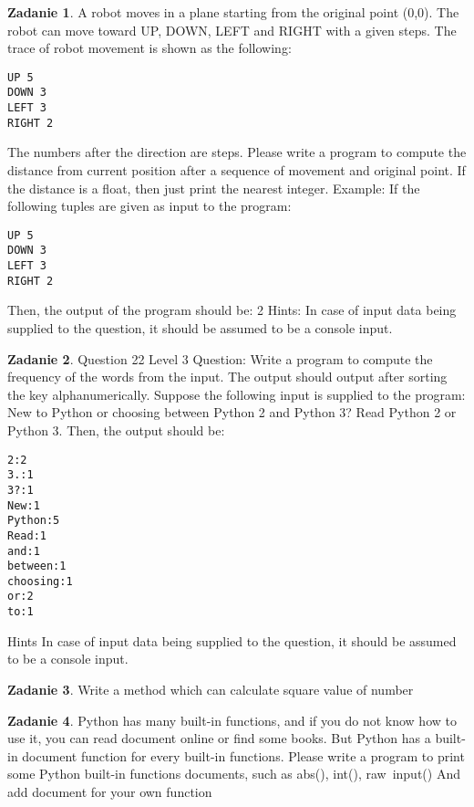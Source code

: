 \documentclass[11pt]{article}
\theoremstyle{definition}
\newtheorem{zadanie}{Zadanie}
\begin{document}
\begin{zadanie}
A robot moves in a plane starting from the original point (0,0). The robot can move toward UP, DOWN, LEFT and RIGHT with a given steps. The trace of robot movement is shown as the following:
\begin{verbatim}
UP 5
DOWN 3
LEFT 3
RIGHT 2
\end{verbatim}
The numbers after the direction are steps. Please write a program to compute the distance from current position after a sequence of movement and original point. If the distance is a float, then just print the nearest integer.
Example:
If the following tuples are given as input to the program:
\begin{verbatim}
UP 5
DOWN 3
LEFT 3
RIGHT 2
\end{verbatim}
Then, the output of the program should be:
2
Hints:
In case of input data being supplied to the question, it should be assumed to be a console input.

\end{zadanie}

\begin{zadanie}
Question 22
Level 3
Question:
Write a program to compute the frequency of the words from the input. The output should output after sorting the key alphanumerically.
Suppose the following input is supplied to the program:
New to Python or choosing between Python 2 and Python 3? Read Python 2 or Python 3.
Then, the output should be:
\begin{verbatim}
2:2
3.:1
3?:1
New:1
Python:5
Read:1
and:1
between:1
choosing:1
or:2
to:1
\end{verbatim}
Hints
In case of input data being supplied to the question, it should be assumed to be a console input.

\end{zadanie}

\begin{zadanie}
Write a method which can calculate square value of number

\end{zadanie}

\begin{zadanie}
Python has many built-in functions, and if you do not know how to use it, you can read document online or find some books. But Python has a built-in document function for every built-in functions.
Please write a program to print some Python built-in functions documents, such as abs(), int(), raw\
input()
And add document for your own function

\end{zadanie}
\end{document}

